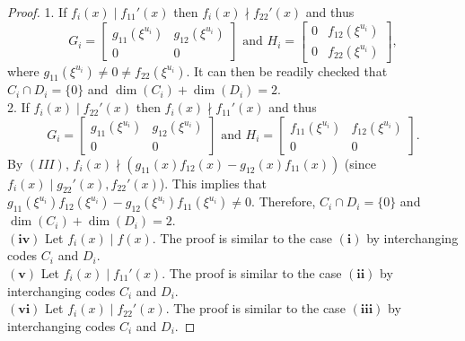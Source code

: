 \documentclass[12 pt]{extarticle}
\numberwithin{equation}{section}
\theoremstyle{definition}
\begin{document}
\begin{proof}
1. If $f_i(x)\mid f_{11}'(x)$ then $f_i(x)\nmid f_{22}'(x)$ and thus
$$
G_i=   \begin{bmatrix}
g_{11}(\xi^{u_i}) & g_{12}(\xi^{u_i}) \\
0 &  0
\end{bmatrix} 
 \text{ and }
H_i=   \begin{bmatrix}
0 & f_{12}(\xi^{u_i}) \\
0 &   f_{22}(\xi^{u_i})
\end{bmatrix},
$$ where $g_{11}(\xi^{u_i})\neq 0\neq f_{22}(\xi^{u_i})$.
It can then be readily checked that $C_i \cap D_i= \{0\}$ and $\dim(C_i)+\dim(D_i)=2$.\\
2. If $f_i(x)\mid f_{22}'(x)$ then $f_i(x)\nmid f_{11}'(x)$ and thus
$$
G_i=   \begin{bmatrix}
g_{11}(\xi^{u_i}) & g_{12}(\xi^{u_i}) \\
0 &  0
\end{bmatrix} \text{ and }
H_i=   \begin{bmatrix}
 f_{11}(\xi^{u_i})& f_{12}(\xi^{u_i}) \\
0 &   0
\end{bmatrix}.
$$
By $(III)$, $f_i(x)\nmid (g_{11}(x)f_{12}(x)-g_{12}(x)f_{11}(x)) $ (since $f_i(x)\mid g_{22}'(x),f_{22}'(x)$). This implies that $g_{11}(\xi^{u_i})f_{12}(\xi^{u_i})-g_{12}(\xi^{u_i})f_{11}(\xi^{u_i})\neq0$. Therefore,  $C_i \cap D_i= \{0\}$ and $\dim(C_i)+\dim(D_i)=2$.\\
$\bm{(iv)}$ Let $f_i(x)\mid f(x)$. The proof is similar to the case $\bm{(i)}$ by interchanging 
codes $C_i$ and $D_i$.\\
$\bm{(v)}$ Let $f_i(x)\mid f_{11}'(x)$. The proof is similar to the case $\bm{(ii)}$ by interchanging 
codes $C_i$ and $D_i$.\\
$\bm{(vi)}$ Let $f_i(x)\mid f_{22}'(x)$. The proof is similar to the case $\bm{(iii)}$ by interchanging 
codes $C_i$ and $D_i$.
\end{proof}
\end{document}
